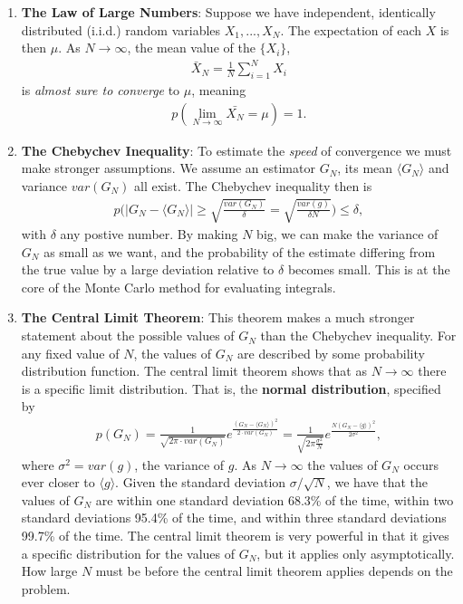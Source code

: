\documentclass[twoside,english]{uiofysmaster}
\begin{document}
\begin{enumerate}
\item \textbf{The Law of Large Numbers}: Suppose we have independent, identically distributed (i.i.d.) random variables $X_1,...,X_N$. The expectation of each $X$ is then $\mu$. As $N\rightarrow \infty$, the mean value of the $\{ X_i \}$, 
\begin{align}
	\bar{X}_N = \frac{1}{N} \sum_{i=1}^N X_i
\end{align}
is \textit{almost sure to converge} to $\mu$, meaning
\begin{align}
	p(\lim_{N\to \infty} \bar{X_N} = \mu) = 1 .
\end{align}

\item \textbf{The Chebychev Inequality}: To estimate the
  \textit{speed} of convergence we must make stronger assumptions. We
  assume an estimator $G_N$, its mean $\langle G_N \rangle$ and
  variance $var(G_N)$ all exist. The Chebychev inequality then is
\begin{align}
	p\bigg (|G_N - \langle G_N \rangle | \geq \sqrt{\frac{var(G_N)}{\delta}} = \sqrt{\frac{var(g)}{\delta N}} \bigg ) \leq \delta, 
\end{align}
with $\delta$ any postive number. By making $N$ big, we can make the
variance of $G_N$ as small as we want, and the probability of the
estimate differing from the true value by a large deviation relative
to $\delta$ becomes small. This is at the core of the Monte Carlo
method for evaluating integrals.

\item \textbf{The Central Limit Theorem}: This theorem makes a much
  stronger statement about the possible values of $G_N$ than the
  Chebychev inequality. For any fixed value of $N$, the values of
  $G_N$ are described by some probability distribution function. The
  central limit theorem shows that as $N\rightarrow \infty$ there is a
  specific limit distribution. That is, the \textbf{normal distribution}, specified by
\begin{align}
	p(G_N) = \frac{1}{\sqrt{2\pi \cdot var(G_N)}} e^\frac{( G_N - \langle G_N \rangle )^2 }{2 \cdot var(G_N)}
	= \frac{1}{\sqrt{2\pi \frac{\sigma^2}{N} }} e^{\frac{N(G_N - \langle g\rangle)^2}{2\sigma^2}},
\end{align}
where $\sigma^2 = var(g)$, the variance of $g$.  As $N\rightarrow
\infty$ the values of $G_N$ occurs ever closer to $\langle g
\rangle$. Given the standard deviation $\sigma/\sqrt{N}$, we have that
the values of $G_N$ are within one standard deviation 68.3\% of the
time, within two standard deviations 95.4\% of the time, and within
three standard deviations 99.7\% of the time.  The central limit
theorem is very powerful in that it gives a specific distribution for
the values of $G_N$, but it applies only asymptotically. How large $N$
must be before the central limit theorem applies depends on the
problem.

\end{enumerate}
\end{document}
